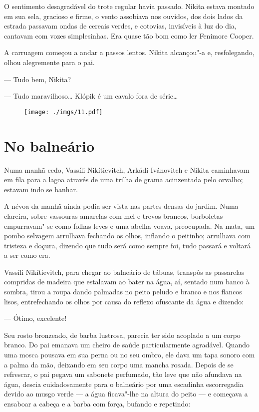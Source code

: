O sentimento desagradável do trote regular havia passado. Nikita estava
montado em sua sela, gracioso e firme, o vento assobiava nos ouvidos,
dos dois lados da estrada passavam ondas de cereais verdes, e cotovias,
invisíveis à luz do dia, cantavam com vozes simplesinhas. Era quase tão
bom como ler Fenimore Cooper.

A carruagem começou a andar a passos lentos. Nikita alcançou"-a e,
resfolegando, olhou alegremente para o pai.

--- Tudo bem, Nikita?

--- Tudo maravilhoso\ldots{} Klópik é um cavalo fora de série\ldots{}


\begin{figure}
\vspace*{-2.1cm}
\hspace*{-2.5cm}\texttt{[image: ./imgs/11.pdf]}
\end{figure}


\chapter{No balneário}

Numa manhã cedo, Vassíli Nikítievitch, Arkádi Ivánovitch e Nikita
caminhavam em fila para a lagoa através de uma trilha de grama acinzentada pelo
orvalho; estavam indo se banhar.

A névoa da manhã ainda podia ser vista nas partes densas do jardim. Numa
clareira, sobre vassouras amarelas com mel e trevos brancos, borboletas
empurravam"-se como folhas leves e uma abelha voava, preocupada. Na mata,
um pombo selvagem arrulhava fechando os olhos, inflando o peitinho;
arrulhava com tristeza e doçura, dizendo que tudo será como sempre foi,
tudo passará e voltará a ser como era.

Vassíli Nikítievitch, para chegar ao balneário de tábuas, transpôs as passarelas compridas de madeira que estalavam ao bater na água, aí,
sentado num banco à sombra, tirou a roupa dando palmadas no peito peludo
e branco e nos flancos lisos, entrefechando os olhos por causa do reflexo
ofuscante da água e dizendo:

--- Ótimo, excelente!

Seu rosto bronzeado, de barba lustrosa, parecia ter sido acoplado a um
corpo branco. Do pai emanava um cheiro de saúde particularmente
agradável. Quando uma mosca pousava em sua perna ou no seu ombro, ele
dava um tapa sonoro com a palma da mão, deixando em seu corpo uma mancha
rosada. Depois de se refrescar, o pai pegava um sabonete perfumado, tão
leve que não afundava na água, descia cuidadosamente para o balneário
por uma escadinha escorregadia devido ao musgo verde --- a água
ficava"-lhe na altura do peito --- e começava a ensaboar a cabeça e a
barba com força, bufando e repetindo:

